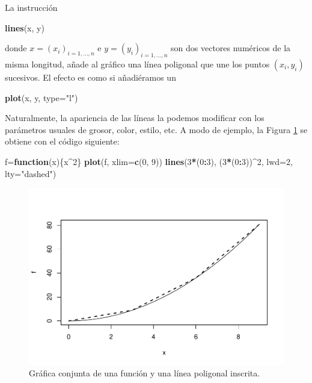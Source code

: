 \documentclass[
]{book}
\newenvironment{Shaded}{\begin{snugshade}}{\end{snugshade}}
\newcommand{\ControlFlowTok}[1]{\textcolor[rgb]{0.13,0.29,0.53}{\textbf{#1}}}
\newcommand{\DataTypeTok}[1]{\textcolor[rgb]{0.13,0.29,0.53}{#1}}
\newcommand{\DecValTok}[1]{\textcolor[rgb]{0.00,0.00,0.81}{#1}}
\newcommand{\KeywordTok}[1]{\textcolor[rgb]{0.13,0.29,0.53}{\textbf{#1}}}
\newcommand{\NormalTok}[1]{#1}
\newcommand{\OperatorTok}[1]{\textcolor[rgb]{0.81,0.36,0.00}{\textbf{#1}}}
\newcommand{\StringTok}[1]{\textcolor[rgb]{0.31,0.60,0.02}{#1}}
\theoremstyle{definition}
\theoremstyle{definition}
\theoremstyle{definition}
\theoremstyle{remark}
\begin{document}
La instrucción

\begin{Shaded}
\begin{Highlighting}[]
\KeywordTok{lines}\NormalTok{(x, y)}
\end{Highlighting}
\end{Shaded}

donde \(x=(x_i)_{i=1, \ldots, n}\) e \(y=(y_i)_{i=1, \ldots, n}\) son dos vectores numéricos de la misma longitud, añade al gráfico una línea poligonal que une los puntos \((x_i, y_i)\) sucesivos. El efecto es como si añadiéramos un

\begin{Shaded}
\begin{Highlighting}[]
\KeywordTok{plot}\NormalTok{(x, y, }\DataTypeTok{type=}\StringTok{"l"}\NormalTok{)}
\end{Highlighting}
\end{Shaded}

Naturalmente, la apariencia de las líneas la podemos modificar con los parámetros usuales de grosor, color, estilo, etc. A modo de ejemplo, la Figura \ref{fig:F10016} se obtiene con el código siguiente:

\begin{Shaded}
\begin{Highlighting}[]
\NormalTok{f=}\ControlFlowTok{function}\NormalTok{(x)\{x}\OperatorTok{\^{}}\DecValTok{2}\NormalTok{\}}
\KeywordTok{plot}\NormalTok{(f, }\DataTypeTok{xlim=}\KeywordTok{c}\NormalTok{(}\DecValTok{0}\NormalTok{, }\DecValTok{9}\NormalTok{))}
\KeywordTok{lines}\NormalTok{(}\DecValTok{3}\OperatorTok{*}\NormalTok{(}\DecValTok{0}\OperatorTok{:}\DecValTok{3}\NormalTok{), (}\DecValTok{3}\OperatorTok{*}\NormalTok{(}\DecValTok{0}\OperatorTok{:}\DecValTok{3}\NormalTok{))}\OperatorTok{\^{}}\DecValTok{2}\NormalTok{, }\DataTypeTok{lwd=}\DecValTok{2}\NormalTok{, }\DataTypeTok{lty=}\StringTok{"dashed"}\NormalTok{)}
\end{Highlighting}
\end{Shaded}

\begin{figure}

{\centering \includegraphics[width=0.9\linewidth]{07chap06_Graficos_I_files/figure-latex/F10016-1} 

}

\caption{Gráfica conjunta de una función y una línea poligonal inscrita.}\label{fig:F10016}
\end{figure}
\end{document}
